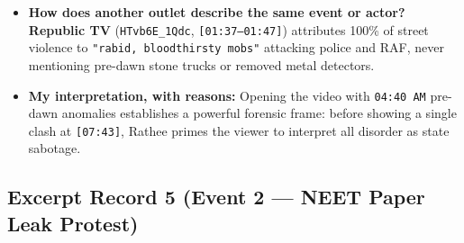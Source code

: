 \documentclass[10pt,a4paper]{article}
\begin{document}
\begin{itemize}[leftmargin=1.5em, itemsep=3pt, topsep=4pt]
  \item \textbf{How does another outlet describe the same event or actor?} \textbf{Republic TV} (\texttt{HTvb6E\_1Qdc}, \texttt{[01:37--01:47]}) attributes 100\% of street violence to \texttt{"rabid, bloodthirsty mobs"} attacking police and RAF, never mentioning pre-dawn stone trucks or removed metal detectors.
  \item \textbf{My interpretation, with reasons:} Opening the video with \texttt{04:40 AM} pre-dawn anomalies establishes a powerful forensic frame: before showing a single clash at \texttt{[07:43]}, Rathee primes the viewer to interpret all disorder as state sabotage.
\end{itemize}

\subsection*{Excerpt Record 5 (Event 2 --- NEET Paper Leak Protest)}
\end{document}
